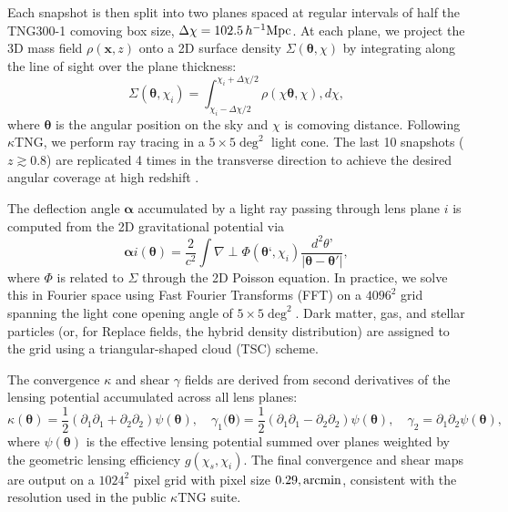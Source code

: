 \documentclass[linenumbers,trackchanges]{aastex701}
\begin{document}
Each snapshot is then split into two planes spaced at regular intervals of half the TNG300-1 comoving box size, $\Delta \chi = 102.5\,h^{-1}{\rm Mpc}$. At each plane, we project the 3D mass field $\rho(\bm{x},z)$ onto a 2D surface density $\Sigma(\bm{\theta},\chi)$ by integrating along the line of sight over the plane thickness:
\begin{equation}\label{eq:delta_plane}
\Sigma(\bm{\theta}, \chi_i) = \int_{\chi_i - \Delta\chi/2}^{\chi_i + \Delta\chi/2} \rho(\chi \bm{\theta}, \chi), d\chi,
\end{equation}
where $\bm{\theta}$ is the angular position on the sky and $\chi$ is comoving distance. Following $\kappa$TNG, we perform ray tracing in a $5\times 5\deg^2$ light cone. The last 10 snapshots ($z \gtrsim 0.8$) are replicated 4 times in the transverse direction to achieve the desired angular coverage at high redshift \citep{Osato21}.

The deflection angle $\bm{\alpha}$ accumulated by a light ray passing through lens plane $i$ is computed from the 2D gravitational potential via
\begin{equation}
\bm{\alpha}i(\bm{\theta}) = \frac{2}{c^2} \int \nabla{\perp} \Phi(\bm{\theta}‘, \chi_i) \frac{d^2\theta’}{|\bm{\theta} - \bm{\theta}'|},
\end{equation}
where $\Phi$ is related to $\Sigma$ through the 2D Poisson equation. In practice, we solve this in Fourier space using Fast Fourier Transforms (FFT) on a $4096^2$ grid spanning the light cone opening angle of $5\times 5\deg^2$. Dark matter, gas, and stellar particles (or, for Replace fields, the hybrid density distribution) are assigned to the grid using a triangular-shaped cloud (TSC) scheme.

The convergence $\kappa$ and shear $\gamma$ fields are derived from second derivatives of the lensing potential accumulated across all lens planes:
\begin{equation}
\kappa(\bm{\theta}) = \frac{1}{2} (\partial_1 \partial_1 + \partial_2 \partial_2)\psi(\bm{\theta}), \quad
\gamma_1(\bm{\theta)} = \frac{1}{2}(\partial_1\partial_1 - \partial_2\partial_2)\psi(\bm{\theta}), \quad
\gamma_2 = \partial_1\partial_2 \psi(\bm{\theta}),
\end{equation}
where $\psi(\bm{\theta})$ is the effective lensing potential summed over planes weighted by the geometric lensing efficiency $g(\chi_s, \chi_i)$. The final convergence and shear maps are output on a $1024^2$ pixel grid with pixel size $0.29,{\rm arcmin}$, consistent with the resolution used in the public $\kappa$TNG  suite.
\end{document}
